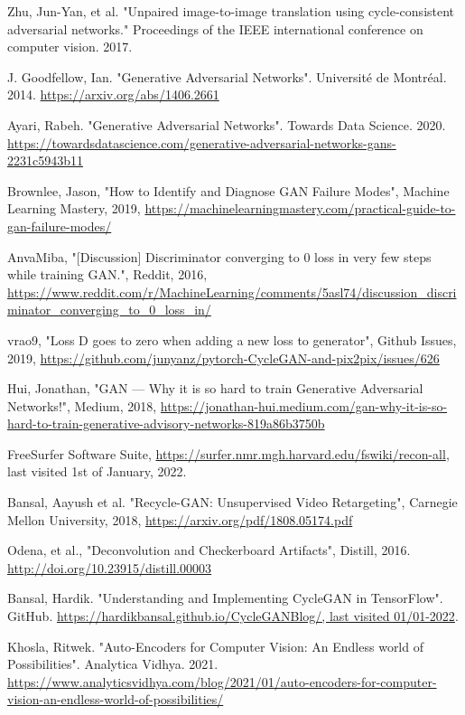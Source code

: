 \documentclass[12pt, fleqn, titlepage]{article}
\begin{document}
\begin{thebibliography}{9}
		 Zhu, Jun-Yan, et al. "Unpaired image-to-image translation using cycle-consistent adversarial networks." Proceedings of the IEEE international conference on computer vision. 2017.
		
		 J. Goodfellow, Ian. "Generative Adversarial Networks". Université de Montréal. 2014. \url{https://arxiv.org/abs/1406.2661}
		
		 Ayari, Rabeh. "Generative Adversarial Networks". Towards Data Science. 2020. \url{https://towardsdatascience.com/generative-adversarial-networks-gans-2231c5943b11}
		
		 Brownlee, Jason, "How to Identify and Diagnose GAN Failure Modes", Machine Learning Mastery, 2019, \url{https://machinelearningmastery.com/practical-guide-to-gan-failure-modes/}
		
		 AnvaMiba, "[Discussion] Discriminator converging to 0 loss in very few steps while training GAN.", Reddit, 2016, \url{https://www.reddit.com/r/MachineLearning/comments/5asl74/discussion\_discriminator\_converging\_to\_0\_loss\_in/}
		
		 vrao9, "Loss D goes to zero when adding a new loss to generator", Github Issues, 2019, \url{https://github.com/junyanz/pytorch-CycleGAN-and-pix2pix/issues/626}
		
		 Hui, Jonathan, "GAN — Why it is so hard to train Generative Adversarial Networks!", Medium, 2018, \url{https://jonathan-hui.medium.com/gan-why-it-is-so-hard-to-train-generative-advisory-networks-819a86b3750b}
		
		 FreeSurfer Software Suite, \url{https://surfer.nmr.mgh.harvard.edu/fswiki/recon-all}, last visited 1st of January, 2022.

		 Bansal, Aayush et al. "Recycle-GAN: Unsupervised Video Retargeting", Carnegie Mellon University, 2018, \url{https://arxiv.org/pdf/1808.05174.pdf}
		
		 Odena, et al., "Deconvolution and Checkerboard Artifacts", Distill, 2016. \url{http://doi.org/10.23915/distill.00003}
		
		 Bansal, Hardik. "Understanding and Implementing CycleGAN in TensorFlow". GitHub. \url{https://hardikbansal.github.io/CycleGANBlog/, last visited 01/01-2022}.
		
		 Khosla, Ritwek. "Auto-Encoders for Computer Vision: An Endless world of Possibilities". Analytica Vidhya. 2021. \url{https://www.analyticsvidhya.com/blog/2021/01/auto-encoders-for-computer-vision-an-endless-world-of-possibilities/}
		

\end{thebibliography}
\end{document}
